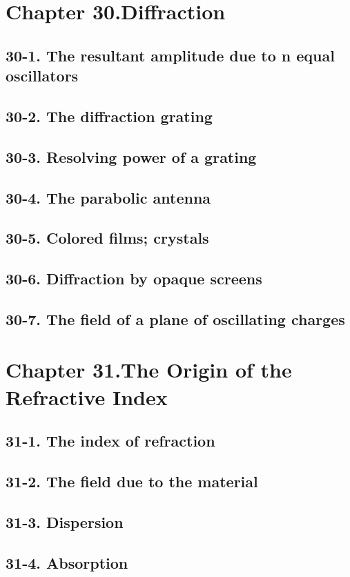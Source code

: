 \documentclass{article}
\begin{document}
\section{Chapter 30.Diffraction}
\subsection{30-1. The resultant amplitude due to n equal oscillators}
\subsection{30-2. The diffraction grating}
\subsection{30-3. Resolving power of a grating}
\subsection{30-4. The parabolic antenna}
\subsection{30-5. Colored films; crystals}
\subsection{30-6. Diffraction by opaque screens}
\subsection{30-7. The field of a plane of oscillating charges}
\section{Chapter 31.The Origin of the Refractive Index}
\subsection{31-1. The index of refraction}
\subsection{31-2. The field due to the material}
\subsection{31-3. Dispersion}
\subsection{31-4. Absorption}
\end{document}
